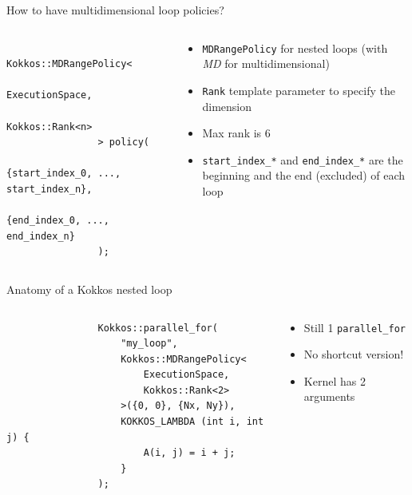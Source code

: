 \documentclass[
    aspectratio=169,
]{beamer}
\begin{document}
\begin{frame}[fragile]{How to have multidimensional loop policies?}
    \begin{columns}
        \begin{column}{0.6\linewidth}
            \begin{verbatim}
                Kokkos::MDRangePolicy<
                    ExecutionSpace,
                    Kokkos::Rank<n>
                > policy(
                    {start_index_0, ..., start_index_n},
                    {end_index_0, ..., end_index_n}
                );
            \end{verbatim}
        \end{column}
        \begin{column}{0.4\linewidth}
            \begin{itemize}
                \item \texttt{MDRangePolicy} for nested loops (with \emph{MD} for multidimensional)
                \item \texttt{Rank} template parameter to specify the dimension
                \item Max rank is 6
                \item \texttt{start\_index\_*} and \texttt{end\_index\_*} are the beginning and the end (excluded) of each loop
            \end{itemize}
        \end{column}
    \end{columns}
\end{frame}


\begin{frame}[fragile]{Anatomy of a Kokkos nested loop}
    \begin{columns}
        \begin{column}{0.6\linewidth}
            \begin{verbatim}
                Kokkos::parallel_for(
                    "my_loop",
                    Kokkos::MDRangePolicy<
                        ExecutionSpace,
                        Kokkos::Rank<2>
                    >({0, 0}, {Nx, Ny}),
                    KOKKOS_LAMBDA (int i, int j) {
                        A(i, j) = i + j;
                    }
                );
            \end{verbatim}
        \end{column}
        \begin{column}{0.4\linewidth}
            \begin{itemize}
                \item Still 1 \texttt{parallel\_for}
                \item No shortcut version!
                \item Kernel has 2 arguments
            \end{itemize}
        \end{column}
    \end{columns}
\end{frame}
\end{document}
